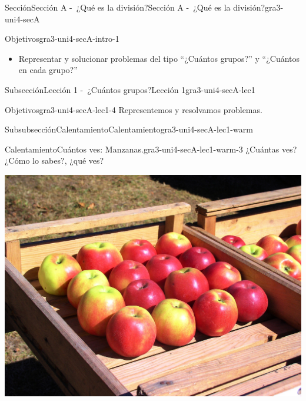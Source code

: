 \documentclass[twoside,10pt,]{article}
\begin{document}
%
%
\typeout{************************************************}
\typeout{************************************************}
%
\begin{sectionptx}{Sección}{Sección A -~¿Qué es la división?}{}{Sección A -~¿Qué es la división?}{}{}{gra3-uni4-secA}
\begin{introduction}{}%
\begin{objectives}{Objetivos}{gra3-uni4-secA-intro-1}
%
\begin{itemize}[label=\textbullet]
\item{}Representar y solucionar problemas del tipo “¿Cuántos grupos?” y “¿Cuántos en cada grupo?”%
\end{itemize}
\end{objectives}
\end{introduction}%
%
%
\typeout{************************************************}
\typeout{************************************************}
%
\begin{subsectionptx}{Subsección}{Lección 1 -~¿Cuántos grupos?}{}{Lección 1}{}{}{gra3-uni4-secA-lec1}
\begin{objectives}{Objetivos}{gra3-uni4-secA-lec1-4}
Representemos y resolvamos problemas.%
\end{objectives}
%
%
\typeout{************************************************}
\typeout{************************************************}
%
\begin{subsubsectionptx}{Subsubsección}{Calentamiento}{}{Calentamiento}{}{}{gra3-uni4-secA-lec1-warm}
\begin{exploration}{Calentamiento}{Cuántos ves: Manzanas.}{gra3-uni4-secA-lec1-warm-3}%
¿Cuántas ves? ¿Cómo lo sabes?, ¿qué ves?%
\begin{image}{0}{1}{0}{}%
\includegraphics[width=\linewidth]{external/jpg-source/apples-1642732_1920.jpg}

\end{image}
\end{exploration}
\end{subsubsectionptx}
\end{subsectionptx}
\end{sectionptx}
\end{document}
